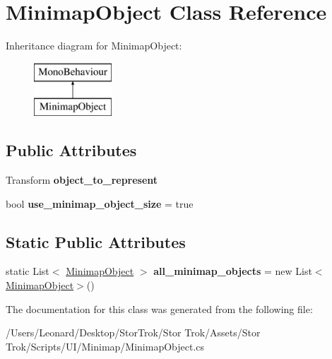 \hypertarget{class_minimap_object}{}\section{Minimap\+Object Class Reference}
\label{class_minimap_object}
Inheritance diagram for Minimap\+Object\+:\begin{figure}[H]
\begin{center}
\leavevmode
\includegraphics[height=2.000000cm]{class_minimap_object}
\end{center}
\end{figure}
\subsection*{Public Attributes}
\begin{DoxyCompactItemize}
\item 
\mbox{\label{class_minimap_object_afa7543be4741d229023738ee5483e74f}} 
Transform {\bfseries object\+\_\+to\+\_\+represent}
\item 
\mbox{\label{class_minimap_object_a95b0ed31b33212c4a618f9b029327b65}} 
bool {\bfseries use\+\_\+minimap\+\_\+object\+\_\+size} = true
\end{DoxyCompactItemize}
\subsection*{Static Public Attributes}
\begin{DoxyCompactItemize}
\item 
\mbox{\label{class_minimap_object_afae247d677a3f7fa91d5e145e7ff4cbd}} 
static List$<$ \hyperlink{class_minimap_object}{Minimap\+Object} $>$ {\bfseries all\+\_\+minimap\+\_\+objects} = new List$<$\hyperlink{class_minimap_object}{Minimap\+Object}$>$()
\end{DoxyCompactItemize}


The documentation for this class was generated from the following file\+:\begin{DoxyCompactItemize}
\item 
/\+Users/\+Leonard/\+Desktop/\+Stor\+Trok/\+Stor Trok/\+Assets/\+Stor Trok/\+Scripts/\+U\+I/\+Minimap/Minimap\+Object.\+cs\end{DoxyCompactItemize}
